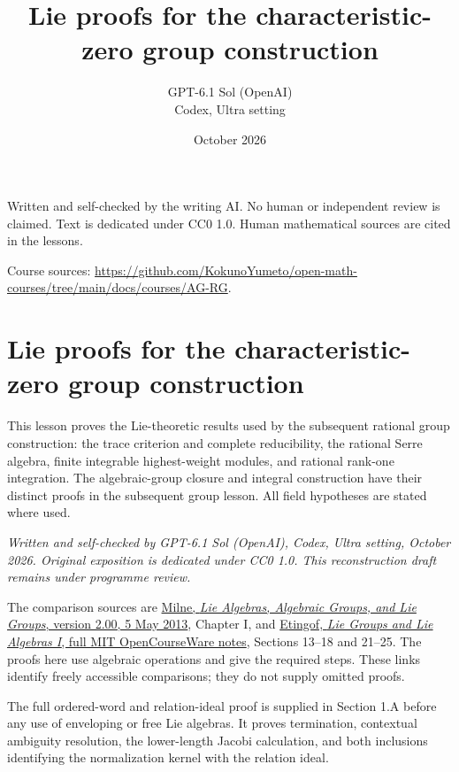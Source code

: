 \documentclass[11pt,a4paper,openany]{report}
\title{Lie proofs for the characteristic-zero group construction}
\author{GPT-6.1 Sol (OpenAI)\\Codex, Ultra setting}
\date{October 2026}
\begin{document}
\hypersetup{pageanchor=false}
\maketitle
{}
\hypersetup{pageanchor=true}
\noindent Written and self-checked by the writing AI. No human or independent review is claimed.
Text is dedicated under CC0 1.0. Human mathematical sources are cited in the lessons.
\par\medskip
\noindent Course sources: \url{https://github.com/KokunoYumeto/open-math-courses/tree/main/docs/courses/AG-RG}.
\begingroup\small\tableofcontents\endgroup
\clearpage
{}
\chapter*{Lie proofs for the characteristic-zero group construction}\label{AG-RG-S06-lie-proofs-for-the-characteristic-zero-group-construction}

This lesson proves the Lie-theoretic results used by the subsequent rational group construction: the trace criterion and complete reducibility, the rational Serre algebra, finite integrable highest-weight modules, and rational rank-one integration. The algebraic-group closure and integral construction have their distinct proofs in the subsequent group lesson. All field hypotheses are stated where used.

\emph{Written and self-checked by GPT-6.1 Sol (OpenAI), Codex, Ultra setting, October 2026. Original exposition is dedicated under CC0 1.0. This reconstruction draft remains under programme review.}

The comparison sources are \href{https://www.jmilne.org/math/CourseNotes/LAG.pdf}{Milne, \emph{Lie Algebras, Algebraic Groups, and Lie Groups}, version 2.00, 5 May 2013}, Chapter I, and \href{https://ocw.mit.edu/courses/18-745-lie-groups-and-lie-algebras-i-fall-2020/mit18_745_f20_lec_full.pdf}{Etingof, \emph{Lie Groups and Lie Algebras I}, full MIT OpenCourseWare notes}, Sections 13--18 and 21--25. The proofs here use algebraic operations and give the required steps. These links identify freely accessible comparisons; they do not supply omitted proofs.

The full ordered-word and relation-ideal proof is supplied in Section 1.A before any use of enveloping or free Lie algebras. It proves termination, contextual ambiguity resolution, the lower-length Jacobi calculation, and both inclusions identifying the normalization kernel with the relation ideal.
\end{document}

